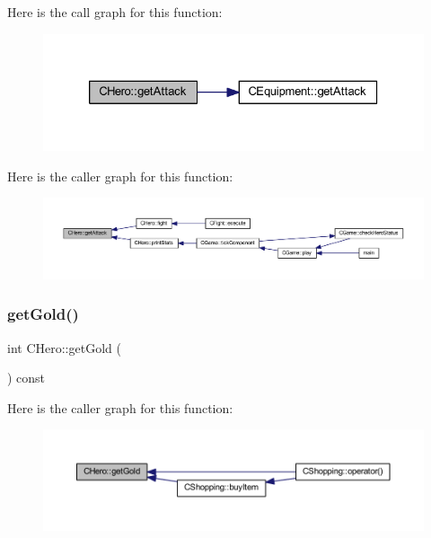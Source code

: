 Here is the call graph for this function\+:\nopagebreak
\begin{figure}[H]
\begin{center}
\leavevmode
\includegraphics[width=326pt]{class_c_hero_a1be25c88254db1f753e1ce89da03ef46_cgraph}
\end{center}
\end{figure}
Here is the caller graph for this function\+:\nopagebreak
\begin{figure}[H]
\begin{center}
\leavevmode
\includegraphics[width=350pt]{class_c_hero_a1be25c88254db1f753e1ce89da03ef46_icgraph}
\end{center}
\end{figure}
\mbox{\label{class_c_hero_a5e3ad0e205d7ac9e4fd2e021a5cc959e}} 
\subsubsection{\texorpdfstring{get\+Gold()}{getGold()}}
{\footnotesize\ttfamily int C\+Hero\+::get\+Gold (\begin{DoxyParamCaption}{ }\end{DoxyParamCaption}) const\hspace{0.3cm}{\ttfamily [inline]}}

Here is the caller graph for this function\+:\nopagebreak
\begin{figure}[H]
\begin{center}
\leavevmode
\includegraphics[width=350pt]{class_c_hero_a5e3ad0e205d7ac9e4fd2e021a5cc959e_icgraph}
\end{center}
\end{figure}
\mbox{\label{class_c_hero_a2968af0dfd838d16690dc67e652b6f89}} 
